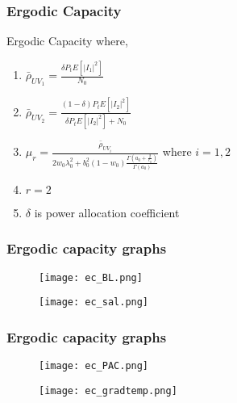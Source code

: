 \documentclass{beamer}
\begin{document}
\begin{frame}
\frametitle{Ergodic Capacity}
\begin{block}{Ergodic Capacity}
where,
\begin{enumerate}
\item $\bar{\rho}_{UV_1} = \frac{\delta P_t E[|I_1|^2]}{N_0} $  
\item $\bar{\rho}_{UV_2} = \frac{(1-\delta) P_t E[|I_2|^2]}{\delta P_t E[|I_2|^2]+N_0} $ 
\item $\mu_r=\frac{\bar{\rho}_{UV_i}}{2w_0 \lambda_0^2 +b_0^2(1-w_0) \frac{\Gamma(a_0+\frac{2}{c_0})}{\Gamma(a_0)}}$ where $i=1,2$
\item $r=2$ 
\item $\delta$ is power allocation coefficient
\end{enumerate}
\end{block}
\end{frame}


\begin{frame}
\frametitle{Ergodic capacity graphs}
\begin{figure}[htb!]
\begin{center}
\texttt{[image: ec\_BL.png]}
\end{center}
\end{figure}

\begin{figure}[htb!]
\begin{center}
\texttt{[image: ec\_sal.png]}
\end{center}
\end{figure}
\end{frame}

\begin{frame}
\frametitle{Ergodic capacity graphs}
\begin{figure}[htb!]
\begin{center}
\texttt{[image: ec\_PAC.png]}
\end{center}
\end{figure}

\begin{figure}[htb!]
\begin{center}
\texttt{[image: ec\_gradtemp.png]}
\end{center}
\end{figure}
\end{frame}
\end{document}
